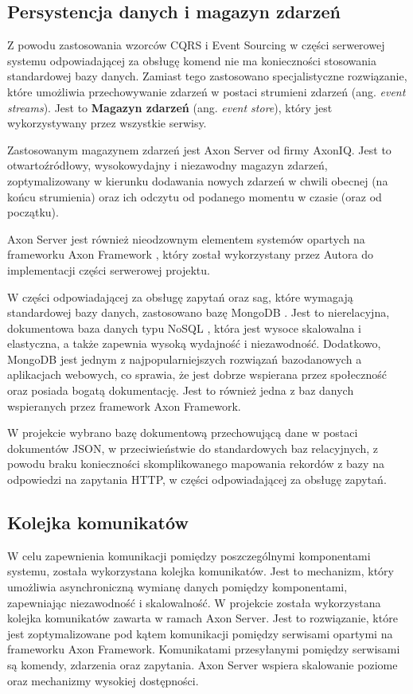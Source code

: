 \subsection{Persystencja danych i magazyn zdarzeń}

Z powodu zastosowania wzorców CQRS i Event Sourcing w części serwerowej systemu odpowiadającej za obsługę komend nie ma konieczności stosowania standardowej bazy danych. Zamiast tego zastosowano specjalistyczne rozwiązanie, które umożliwia przechowywanie zdarzeń w postaci strumieni zdarzeń (ang. \textit{event streams}). Jest to \textbf{Magazyn zdarzeń} (ang. \textit{event store}), który jest wykorzystywany przez wszystkie serwisy.

Zastosowanym magazynem zdarzeń jest Axon Server od firmy AxonIQ. Jest to otwartoźródłowy, wysokowydajny i niezawodny magazyn zdarzeń, zoptymalizowany w kierunku dodawania nowych zdarzeń w chwili obecnej (na końcu strumienia) oraz ich odczytu od podanego momentu w czasie (oraz od początku).

Axon Server jest również nieodzownym elementem systemów opartych na frameworku Axon Framework \cite{axonframework}, który został wykorzystany przez Autora do implementacji części serwerowej projektu.

W części odpowiadającej za obsługę zapytań oraz sag, które wymagają standardowej bazy danych, zastosowano bazę MongoDB \cite{mongodb}. Jest to nierelacyjna, dokumentowa baza danych typu NoSQL \cite{nosql},  która jest wysoce skalowalna i elastyczna, a także zapewnia wysoką wydajność i niezawodność. Dodatkowo, MongoDB jest jednym z najpopularniejszych rozwiązań bazodanowych a aplikacjach webowych, co sprawia, że jest dobrze wspierana przez społeczność oraz posiada bogatą dokumentację. Jest to również jedna z baz danych wspieranych przez framework Axon Framework.

W projekcie wybrano bazę dokumentową przechowującą dane w postaci dokumentów JSON, w przeciwieństwie do standardowych baz relacyjnych, z powodu braku konieczności skomplikowanego mapowania rekordów z bazy na odpowiedzi na zapytania HTTP, w części odpowiadającej za obsługę zapytań.

\subsection{Kolejka komunikatów}

W celu zapewnienia komunikacji pomiędzy poszczególnymi komponentami systemu, została wykorzystana kolejka komunikatów. Jest to mechanizm, który umożliwia asynchroniczną wymianę danych pomiędzy komponentami, zapewniając niezawodność i skalowalność. W projekcie została wykorzystana kolejka komunikatów zawarta w ramach Axon Server. Jest to rozwiązanie, które jest zoptymalizowane pod kątem komunikacji pomiędzy serwisami opartymi na frameworku Axon Framework. Komunikatami przesyłanymi pomiędzy serwisami są komendy, zdarzenia oraz zapytania. Axon Server wspiera skalowanie poziome oraz mechanizmy wysokiej dostępności.

